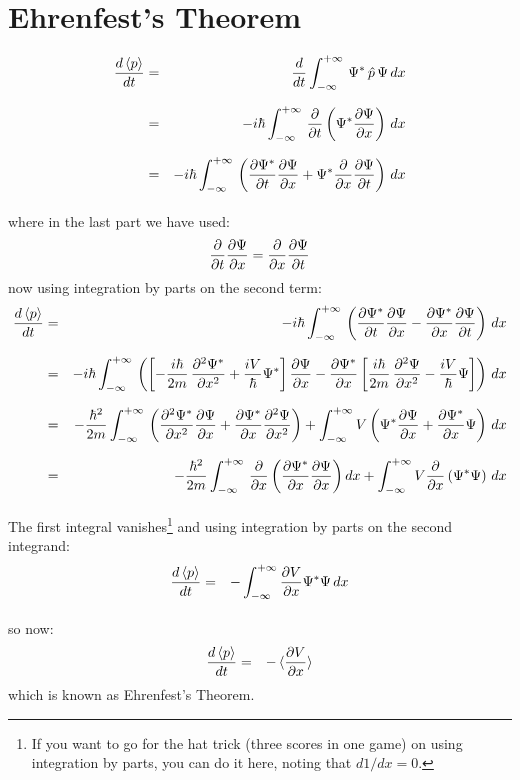 \documentclass[12pt]{book}
\begin{document}
\section{Ehrenfest's Theorem}
\begin{eqnarray*}
\frac{d \braket{p}}{dt} &=& \frac{d}{dt} \int_{-\infty}^{+\infty} \, \Psi^* \, \hat{p} \, \Psi \,dx \\[7pt]
&=& -i \hbar \int_{-\infty}^{+\infty} \, \frac{\partial}{\partial t} \left(\Psi^*  \frac{\partial \Psi}{\partial x} \right) \,dx \\[7pt]
&=& -i \hbar \int_{-\infty}^{+\infty} \, \left(  \frac{\partial \Psi^*}{\partial t}   \frac{\partial \Psi}{\partial x}  + 
\Psi^* \frac{\partial}{\partial x}  \frac{\partial \Psi}{\partial t}  \right) \,dx \\[7pt]
\end{eqnarray*}
where in the last part we have used:
$$\frac{\partial}{\partial t}  \frac{\partial \Psi}{\partial x}  = \frac{\partial}{\partial x}  \frac{\partial \Psi}{\partial t} $$
now using integration by parts on the second term:
\begin{eqnarray*}
\frac{d \braket{p}}{dt} &=& -i \hbar \int_{-\infty}^{+\infty} \, 
\left(  \frac{\partial \Psi^*}{\partial t}   \frac{\partial \Psi}{\partial x}  -  \frac{\partial \Psi^*}{\partial x}   \frac{\partial \Psi}{\partial t}  \right) \,dx \\[7pt]
&=& -i \hbar \int_{-\infty}^{+\infty} \, 
\left( \left[ -\frac{i \hbar}{2 m}\, \frac{\partial^2 \Psi^*}{\partial x^2}  + \frac{i V}{\hbar} \Psi^* \right]  \frac{\partial \Psi}{\partial x}  
-  \frac{\partial \Psi^*}{\partial x}  \left[ \frac{i \hbar}{2 m}\, \frac{\partial^2 \Psi}{\partial x^2}  - \frac{i V}{\hbar} \Psi \right] \right) \,dx \\[7pt]
&=& -\frac{\hbar^2}{2 m} \int_{-\infty}^{+\infty} \, \left( \frac{\partial^2 \Psi^*}{\partial x^2}   \frac{\partial \Psi}{\partial x}  +  \frac{\partial \Psi^*}{\partial x}   \frac{\partial^2 \Psi}{\partial x^2} \right)
+ \int_{-\infty}^{+\infty} V \left( \Psi^*  \frac{\partial \Psi}{\partial x}  +  \frac{\partial \Psi^*}{\partial x}  \Psi \right) \, dx \\[7pt]
&=& -\frac{\hbar^2}{2 m} \int_{-\infty}^{+\infty} \, \frac{\partial}{\partial x} \left( \frac{\partial \Psi^*}{\partial x}   \frac{\partial \Psi}{\partial x} \right) dx
+ \int_{-\infty}^{+\infty} V \frac{\partial}{\partial x} \left( \Psi^* \Psi \right) \, dx \\[7pt]
\end{eqnarray*}
The first integral vanishes\footnote{If you want to go for the hat trick (three scores in one game) on using integration by parts, you can do it here, noting that $d1/dx = 0$.} and using integration by parts on the second integrand:
\begin{eqnarray*}
\frac{d \braket{p}}{dt} &=& -\int_{-\infty}^{+\infty} \frac{\partial V}{\partial x} \Psi^* \Psi \, dx \\[7pt]
\end{eqnarray*}
so now:
\begin{eqnarray}
\label{eqn:ehrenfest}
\frac{d \braket{p}}{dt} &=& - \braket{\frac{\partial V}{\partial x}}
\end{eqnarray}
which is known as Ehrenfest's Theorem.
\end{document}

